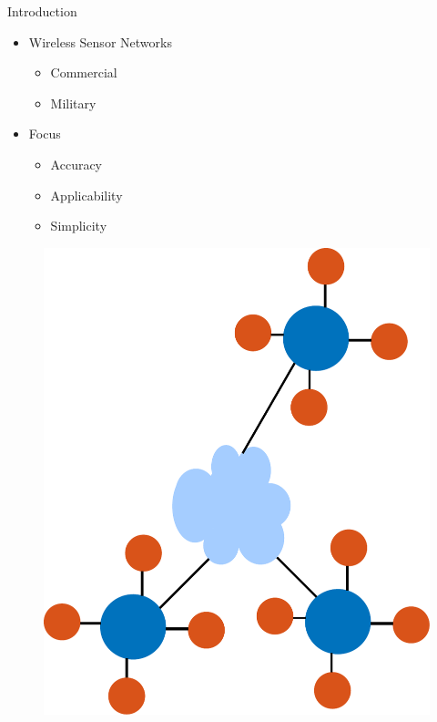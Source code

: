 \documentclass[10pt]{beamer}
\begin{document}
\begin{frame}{Introduction}
\begin{minipage}{0.5\textwidth}
\begin{itemize}
\item Wireless Sensor Networks
\begin{itemize}
\item Commercial
\item Military
\end{itemize}
\item Focus
\begin{itemize}
\item Accuracy
\item Applicability
\item Simplicity
\end{itemize}
\end{itemize}
\end{minipage}
\begin{minipage}{0.45\textwidth}
\begin{figure}[!htbp]
 \centering
  \includegraphics[width = \columnwidth]{figures/wsn_ill.pdf}
  \end{figure}
\end{minipage}
\end{frame}
 
\end{document}
